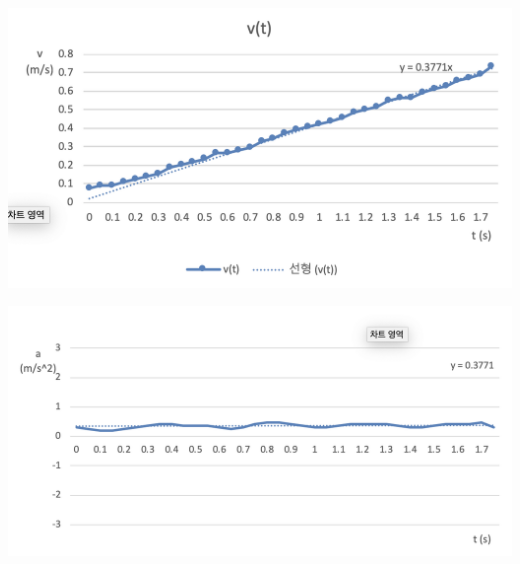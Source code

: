 \documentclass{article}
\begin{document}
\includegraphics[width=\columnwidth]{V.png}

\includegraphics[width=\columnwidth]{AC.png}
\end{document}
